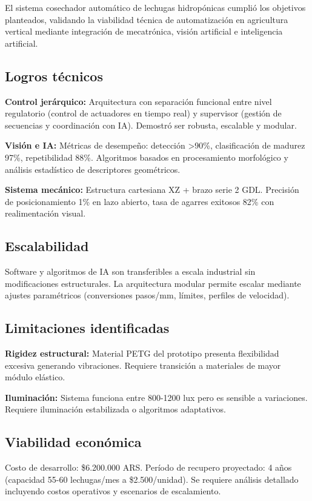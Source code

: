 El sistema cosechador automático de lechugas hidropónicas cumplió los objetivos planteados, validando la viabilidad técnica de automatización en agricultura vertical mediante integración de mecatrónica, visión artificial e inteligencia artificial.

\subsection*{Logros técnicos}

\textbf{Control jerárquico:} Arquitectura con separación funcional entre nivel regulatorio (control de actuadores en tiempo real) y supervisor (gestión de secuencias y coordinación con IA). Demostró ser robusta, escalable y modular.

\textbf{Visión e IA:} Métricas de desempeño: detección >90\%, clasificación de madurez 97\%, repetibilidad 88\%. Algoritmos basados en procesamiento morfológico y análisis estadístico de descriptores geométricos.

\textbf{Sistema mecánico:} Estructura cartesiana XZ + brazo serie 2 GDL. Precisión de posicionamiento 1\% en lazo abierto, tasa de agarres exitosos 82\% con realimentación visual.

\subsection*{Escalabilidad}

Software y algoritmos de IA son transferibles a escala industrial sin modificaciones estructurales. La arquitectura modular permite escalar mediante ajustes paramétricos (conversiones pasos/mm, límites, perfiles de velocidad).

\subsection*{Limitaciones identificadas}

\textbf{Rigidez estructural:} Material PETG del prototipo presenta flexibilidad excesiva generando vibraciones. Requiere transición a materiales de mayor módulo elástico.

\textbf{Iluminación:} Sistema funciona entre 800-1200 lux pero es sensible a variaciones. Requiere iluminación estabilizada o algoritmos adaptativos.

\subsection*{Viabilidad económica}

Costo de desarrollo: \$6.200.000 ARS. Período de recupero proyectado: 4 años (capacidad 55-60 lechugas/mes a \$2.500/unidad). Se requiere análisis detallado incluyendo costos operativos y escenarios de escalamiento.